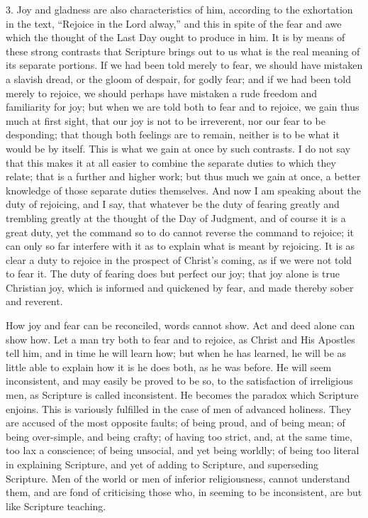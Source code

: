 3. Joy and gladness are also characteristics of him, according to
the exhortation in the text, ``Rejoice in the Lord alway,''
and this in spite of the fear and awe which the thought of the Last
Day ought to produce in him. It is by means of these strong contrasts
that Scripture brings out to us what is the real meaning of its
separate portions. If we had been told merely to fear, we should have
mistaken a slavish dread, or the gloom of despair, for godly fear; and
if we had been told merely to rejoice, we should perhaps have mistaken
a rude freedom and familiarity for joy; but when we are told both to
fear and to rejoice, we gain thus much at first sight, that our joy is
not to be irreverent, nor our fear to be desponding; that though both
feelings are to remain, neither is to be what it would be by itself.
This is what we gain at once by such contrasts. I do not say that this
makes it at all easier to combine the separate duties to which they
relate; that is a further and higher work; but thus much we gain at
once, a better knowledge of those separate duties themselves. And now
I am speaking about the duty of rejoicing, and I say, that whatever be
the duty of fearing greatly and trembling greatly at the thought of
the Day of Judgment, and of course it is a great duty, yet the command
so to do cannot reverse the command to rejoice; it can only so far
interfere with it as to explain what is meant by rejoicing. It is as
clear a duty to rejoice in the prospect of Christ's coming, as if we
were not told to fear it. The duty of fearing does but perfect our
joy; that joy alone is true Christian joy, which is informed and
quickened by fear, and made thereby sober and reverent.

How joy and fear can be reconciled, words cannot show. Act and deed
alone can show how. Let a man try both to fear and to rejoice, as
Christ and His Apostles tell him, and in time he will learn how; but
when he has learned, he will be as little able to explain how it is he
does both, as he was before. He will seem inconsistent, and may easily
be proved to be so, to the satisfaction of irreligious men, as
Scripture is called inconsistent. He becomes the paradox which
Scripture enjoins. This is variously fulfilled in the case of men of
advanced holiness. They are accused of the most opposite faults; of
being proud, and of being mean; of being over-simple, and being
crafty; of having too strict, and, at the same time, too lax a
conscience; of being unsocial, and yet being worldly; of being too
literal in explaining Scripture, and yet of adding to Scripture, and
superseding Scripture. Men of the world or men of inferior
religiousness, cannot understand them, and are fond of criticising
those who, in seeming to be inconsistent, are but like Scripture
teaching.

